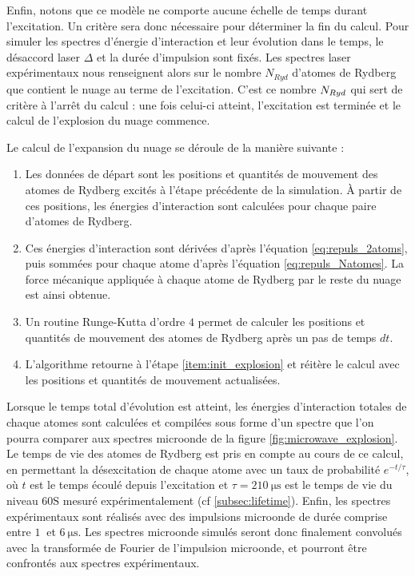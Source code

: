 Enfin, notons que ce modèle ne comporte aucune échelle de temps durant l'excitation.
Un critère sera donc nécessaire pour déterminer la fin du calcul.
Pour simuler les spectres d'énergie d'interaction et leur évolution dans le temps, le désaccord laser $\Delta$ et la durée d'impulsion sont fixés.
Les spectres laser expérimentaux nous renseignent alors sur le nombre $N_{Ryd}$ d'atomes de Rydberg que contient le nuage au terme de l'excitation.
C'est ce nombre $N_{Ryd}$ qui sert de critère à l'arrêt du calcul : une fois celui-ci atteint, l'excitation est terminée et le calcul de l'explosion du nuage commence.

Le calcul de l'expansion du nuage se déroule de la manière suivante :
\begin{enumerate}
\item \label{item:init_explosion}Les données de départ sont les positions et quantités de mouvement des atomes de Rydberg excités à l'étape précédente de la simulation.
\`A partir de ces positions, les énergies d'interaction sont calculées pour chaque paire d'atomes de Rydberg.
\item Ces énergies d'interaction sont dérivées d'après l'équation \eqref{eq:repuls_2atoms}, puis sommées pour chaque atome d'après l'équation \eqref{eq:repuls_Natomes}.
La force mécanique appliquée à chaque atome de Rydberg par le reste du nuage est ainsi obtenue.
\item Un routine Runge-Kutta d'ordre $4$ permet de calculer les positions et quantités de mouvement des atomes de Rydberg après un pas de temps $dt$.
\item L'algorithme retourne à l'étape \ref{item:init_explosion} et réitère le calcul avec les positions et quantités de mouvement actualisées.
\end{enumerate}
Lorsque le temps total d'évolution est atteint, les énergies d'interaction totales de chaque atomes sont calculées et compilées sous forme d'un spectre que l'on pourra comparer aux spectres microonde de la figure \eqref{fig:microwave_explosion}.
Le temps de vie des atomes de Rydberg est pris en compte au cours de ce calcul, en permettant la désexcitation de chaque atome avec un taux de probabilité $e^{-t/\tau}$, où $t$ est le temps écoulé depuis l'excitation et $\tau = \SI{210}{\us}$ est le temps de vie du niveau $\mathrm{60S}$ mesuré expérimentalement (cf \ref{subsec:lifetime}).
Enfin, les spectres expérimentaux sont réalisés avec des impulsions microonde de durée comprise entre $\SI{1}{}$ et $\SI{6}{\us}$.
Les spectres microonde simulés seront donc finalement convolués avec la transformée de Fourier de l'impulsion microonde, et pourront être confrontés aux spectres expérimentaux.

